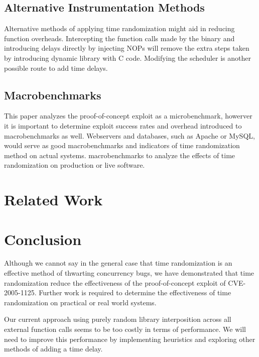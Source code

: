 \documentclass[letterpaper,twocolumn,10pt]{article}
\begin{document}
\subsection{Alternative Instrumentation Methods}
Alternative methods of applying time randomization might aid in reducing function overheads.  Intercepting the function calls made by the binary and introducing delays directly by injecting NOPs will remove the extra steps taken by introducing dynamic library with C code.  Modifying the scheduler is another possible route to add time delays.
\subsection{Macrobenchmarks}
This paper analyzes the proof-of-concept exploit as a microbenchmark, howerver it is important to determine exploit success rates and overhead introduced to macrobenchmarks as well. Webservers and databases, such as Apache or MySQL, would serve as good macrobenchmarks and indicators of time randomization method on actual systems.
macrobenchmarks to analyze the effects of time randomization on production or live software.
\section{Related Work}

\section{Conclusion}
Although we cannot say in the general case that time randomization is an effective method of thwarting concurrency bugs, we have demonstrated that time randomization reduce the effectiveness of the proof-of-concept exploit of CVE-2005-1125.  Further work is required to determine the effectiveness of time randomization on practical or real world systems.

Our current approach using purely random library interposition across all external function calls seems to be too costly in terms of performance.  We will need to improve this performance by implementing heuristics and exploring other methods of adding a time delay.
\end{document}
